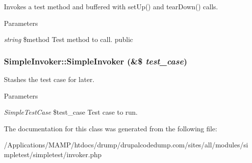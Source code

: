 \label{class_simple_invoker_a9e26c2b57c77dd61f8eb26760aab0c32}
Invokes a test method and buffered with setUp() and tearDown() calls. 
\begin{DoxyParams}{Parameters}
\item[{\em string}]\$method Test method to call.  public \end{DoxyParams}
\hypertarget{class_simple_invoker_a332d48492641f23d71ced8da77e0cc48}{
\subsubsection[{SimpleInvoker}]{\setlength{\rightskip}{0pt plus 5cm}SimpleInvoker::SimpleInvoker (\&\$ {\em test\_\-case})}}
\label{class_simple_invoker_a332d48492641f23d71ced8da77e0cc48}
Stashes the test case for later. 
\begin{DoxyParams}{Parameters}
\item[{\em SimpleTestCase}]\$test\_\-case Test case to run. \end{DoxyParams}


The documentation for this class was generated from the following file:\begin{DoxyCompactItemize}
\item 
/Applications/MAMP/htdocs/drump/drupalcodedump.com/sites/all/modules/simpletest/simpletest/invoker.php\end{DoxyCompactItemize}
